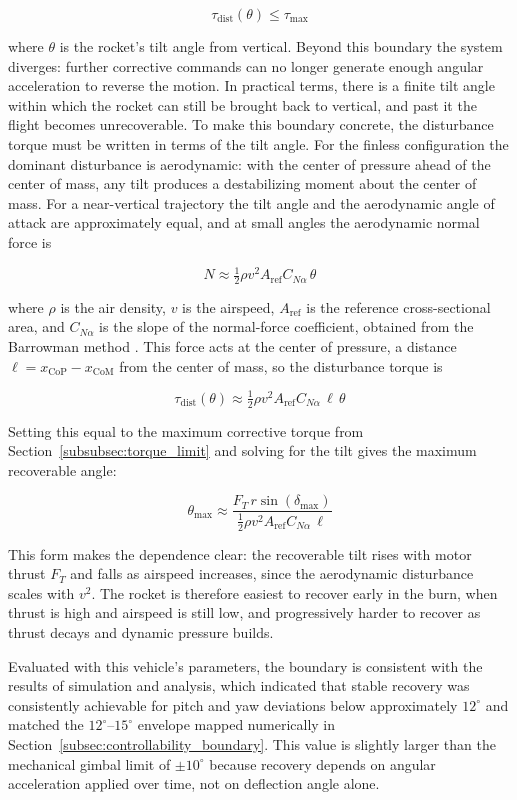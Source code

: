 \[
\tau_{\mathrm{dist}}(\theta) \leq \tau_{\max}
\]

where $\theta$ is the rocket's tilt angle from vertical. Beyond this boundary the system diverges: further corrective commands can no longer generate enough angular acceleration to reverse the motion. In practical terms, there is a finite tilt angle within which the rocket can still be brought back to vertical, and past it the flight becomes unrecoverable. To make this boundary concrete, the disturbance torque must be written in terms of the tilt angle. For the finless configuration the dominant disturbance is aerodynamic: with the center of pressure ahead of the center of mass, any tilt produces a destabilizing moment about the center of mass. For a near-vertical trajectory the tilt angle and the aerodynamic angle of attack are approximately equal, and at small angles the aerodynamic normal force is

\[
N \approx \tfrac{1}{2}\rho v^{2} A_{\mathrm{ref}} C_{N\alpha}\,\theta
\]

where $\rho$ is the air density, $v$ is the airspeed, $A_{\mathrm{ref}}$ is the reference cross-sectional area, and $C_{N\alpha}$ is the slope of the normal-force coefficient, obtained from the Barrowman method \cite{barrowman1967}. This force acts at the center of pressure, a distance $\ell = x_{\mathrm{CoP}} - x_{\mathrm{CoM}}$ from the center of mass, so the disturbance torque is

\[
\tau_{\mathrm{dist}}(\theta) \approx \tfrac{1}{2}\rho v^{2} A_{\mathrm{ref}} C_{N\alpha}\,\ell\,\theta
\]

Setting this equal to the maximum corrective torque from Section~\ref{subsubsec:torque_limit} and solving for the tilt gives the maximum recoverable angle:

\[
\theta_{\max} \approx \frac{F_T\, r \sin(\delta_{\max})}{\tfrac{1}{2}\rho v^{2} A_{\mathrm{ref}} C_{N\alpha}\,\ell}
\]

This form makes the dependence clear: the recoverable tilt rises with motor thrust $F_T$ and falls as airspeed increases, since the aerodynamic disturbance scales with $v^{2}$. The rocket is therefore easiest to recover early in the burn, when thrust is high and airspeed is still low, and progressively harder to recover as thrust decays and dynamic pressure builds.

Evaluated with this vehicle's parameters, the boundary is consistent with the results of simulation and analysis, which indicated that stable recovery was consistently achievable for pitch and yaw deviations below approximately $12^\circ$ and matched the $12^\circ$--$15^\circ$ envelope mapped numerically in Section~\ref{subsec:controllability_boundary}. This value is slightly larger than the mechanical gimbal limit of $\pm 10^\circ$ because recovery depends on angular acceleration applied over time, not on deflection angle alone.


